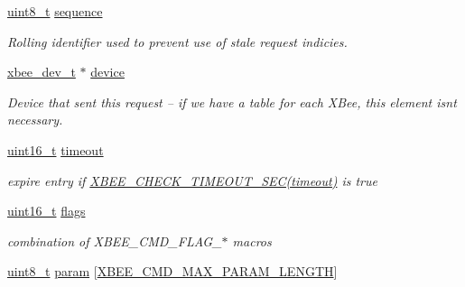 \begin{DoxyCompactItemize}
\item 
\hyperlink{group__hal__dos_gae1affc9ca37cfb624959c866a73f83c2}{uint8\+\_\+t} \hyperlink{structxbee__cmd__request__t_acb5c8866a58116314f6c8eda9dc3544c}{sequence}
\begin{DoxyCompactList}\small\item\em Rolling identifier used to prevent use of stale request indicies. \end{DoxyCompactList}\item 
\hyperlink{structxbee__dev__t}{xbee\+\_\+dev\+\_\+t} $\ast$ \hyperlink{structxbee__cmd__request__t_ac780e07a2b2cd8df18f56240588090c5}{device}
\begin{DoxyCompactList}\small\item\em Device that sent this request -- if we have a table for each X\+Bee, this element isn\textquotesingle{}t necessary. \end{DoxyCompactList}\item 
\mbox{\label{structxbee__cmd__request__t_a7f1ad43d3bf79b40bc39dbb5a6c3a5ae}} 
\hyperlink{group__hal__dos_ga5a8b2dc9e45a9ee81a94ef304fb62505}{uint16\+\_\+t} \hyperlink{structxbee__cmd__request__t_a7f1ad43d3bf79b40bc39dbb5a6c3a5ae}{timeout}
\begin{DoxyCompactList}\small\item\em expire entry if \hyperlink{group__hal_ga858c3c1caa899efd6af9ee8a0fe09246}{X\+B\+E\+E\+\_\+\+C\+H\+E\+C\+K\+\_\+\+T\+I\+M\+E\+O\+U\+T\+\_\+\+S\+E\+C(timeout)} is true \end{DoxyCompactList}\item 
\mbox{\label{structxbee__cmd__request__t_a1e87af3c18a2fd36c61faf89949bdc3f}} 
\hyperlink{group__hal__dos_ga5a8b2dc9e45a9ee81a94ef304fb62505}{uint16\+\_\+t} \hyperlink{structxbee__cmd__request__t_a1e87af3c18a2fd36c61faf89949bdc3f}{flags}
\begin{DoxyCompactList}\small\item\em combination of X\+B\+E\+E\+\_\+\+C\+M\+D\+\_\+\+F\+L\+A\+G\+\_\+$\ast$ macros \end{DoxyCompactList}\item 
\mbox{\label{structxbee__cmd__request__t_a4dd3f2f91ad35819bbed1f14b2b2ad13}} 
\hyperlink{group__hal__dos_gae1affc9ca37cfb624959c866a73f83c2}{uint8\+\_\+t} \hyperlink{structxbee__cmd__request__t_a4dd3f2f91ad35819bbed1f14b2b2ad13}{param} \mbox{[}\hyperlink{group__xbee__atcmd_ga9b1046f9c200c1bb0a9b57cb0ec474df}{X\+B\+E\+E\+\_\+\+C\+M\+D\+\_\+\+M\+A\+X\+\_\+\+P\+A\+R\+A\+M\+\_\+\+L\+E\+N\+G\+TH}\mbox{]}

\end{DoxyCompactItemize}
